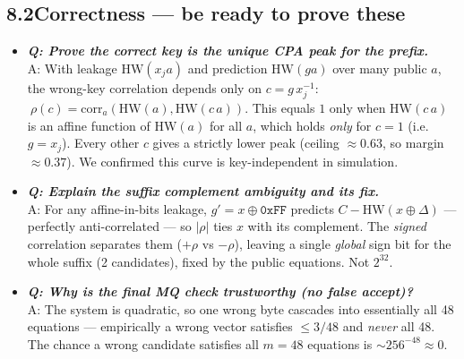 \documentclass[11pt]{article}
\newcommand{\hw}{\mathrm{HW}}
\newcommand{\xor}{\oplus}
\begin{document}
\subsection*{8.2\quad Correctness --- be ready to prove these}
\begin{itemize}
\item \textbf{\textit{Q: Prove the correct key is the unique CPA peak for the prefix.}}\\
A: With leakage $\hw(x_j a)$ and prediction $\hw(g a)$ over many public $a$, the wrong-key
correlation depends only on $c=g\,x_j^{-1}$: $\ \rho(c)=\mathrm{corr}_a(\hw(a),\hw(c\,a))$.
This equals $1$ only when $\hw(c\,a)$ is an affine function of $\hw(a)$ for all $a$, which holds
\emph{only} for $c=1$ (i.e.\ $g=x_j$). Every other $c$ gives a strictly lower peak (ceiling
$\approx 0.63$, so margin $\approx 0.37$). We confirmed this curve is key-independent in simulation.
\item \textbf{\textit{Q: Explain the suffix complement ambiguity and its fix.}}\\
A: For any affine-in-bits leakage, $g'=x\xor\texttt{0xFF}$ predicts $C-\hw(x\xor\Delta)$ ---
perfectly anti-correlated --- so $|\rho|$ ties $x$ with its complement. The \emph{signed}
correlation separates them ($+\rho$ vs $-\rho$), leaving a single \emph{global} sign bit for
the whole suffix (2 candidates), fixed by the public equations. Not $2^{32}$.
\item \textbf{\textit{Q: Why is the final MQ check trustworthy (no false accept)?}}\\
A: The system is quadratic, so one wrong byte cascades into essentially all 48 equations ---
empirically a wrong vector satisfies $\le 3/48$ and \emph{never} all 48. The chance a wrong
candidate satisfies all $m=48$ equations is $\sim 256^{-48}\approx 0$.
\end{itemize}
\end{document}
